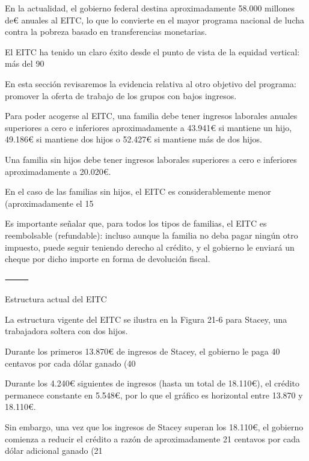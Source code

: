 \documentclass[10pt,a4paper]{article}
\begin{document}
En la actualidad, el gobierno federal destina aproximadamente 58.000 millones de€ anuales al EITC, lo que lo convierte en el mayor programa nacional de lucha contra la pobreza basado en transferencias monetarias.

El EITC ha tenido un claro éxito desde el punto de vista de la equidad vertical: más del 90 %

En esta sección revisaremos la evidencia relativa al otro objetivo del programa: promover la oferta de trabajo de los grupos con bajos ingresos.

Para poder acogerse al EITC, una familia debe tener ingresos laborales anuales superiores a cero e inferiores aproximadamente a 43.941€ si mantiene un hijo, 49.186€ si mantiene dos hijos o 52.427€ si mantiene más de dos hijos.

Una familia sin hijos debe tener ingresos laborales superiores a cero e inferiores aproximadamente a 20.020€.

En el caso de las familias sin hijos, el EITC es considerablemente menor (aproximadamente el 15 %

Es importante señalar que, para todos los tipos de familias, el EITC es reembolsable (refundable): incluso aunque la familia no deba pagar ningún otro impuesto, puede seguir teniendo derecho al crédito, y el gobierno le enviará un cheque por dicho importe en forma de devolución fiscal.

⸻

Estructura actual del EITC

La estructura vigente del EITC se ilustra en la Figura 21-6 para Stacey, una trabajadora soltera con dos hijos.

Durante los primeros 13.870€ de ingresos de Stacey, el gobierno le paga 40 centavos por cada dólar ganado (40 %

Durante los 4.240€ siguientes de ingresos (hasta un total de 18.110€), el crédito permanece constante en 5.548€, por lo que el gráfico es horizontal entre 13.870 y 18.110€.

Sin embargo, una vez que los ingresos de Stacey superan los 18.110€, el gobierno comienza a reducir el crédito a razón de aproximadamente 21 centavos por cada dólar adicional ganado (21 %
\end{document}
